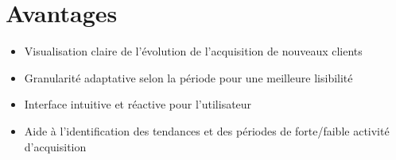 \documentclass[12pt,a4paper]{article}
\begin{document}
\section{Avantages}
\begin{itemize}
    \item Visualisation claire de l'évolution de l'acquisition de nouveaux clients
    \item Granularité adaptative selon la période pour une meilleure lisibilité
    \item Interface intuitive et réactive pour l'utilisateur
    \item Aide à l'identification des tendances et des périodes de forte/faible activité d'acquisition
\end{itemize}
\end{document}

